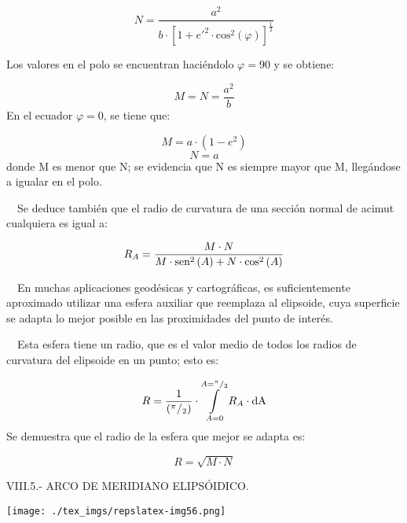 \documentclass{tufte-book}
\newcommand\wideslash[2]{{}^{#1}/_{#2}}
\newcommand\normalsubformula[1]{\text{\mathversion{normal}$#1$}}
\begin{document}
\begin{equation*}
{N=\frac{a^{{2}}}{b\cdot \left[1+e'^{{2}}\cdot \text{cos}^{{2}}\left(\varphi \right)\right]^{{\frac{1}{2}}}}}
\end{equation*}

Los valores en el polo se encuentran haciéndolo  ${\varphi =\text{90}}$ y se obtiene:

\begin{equation*}
{M=N=\frac{a^{{2}}}{b}}
\end{equation*}
En el ecuador  ${\varphi =0}$, se tiene que:

\begin{equation*}
{M=a\cdot \left(1-e^{{2}}\right)}
\end{equation*}
\begin{equation*}
{N=a}
\end{equation*}
donde M es menor que N; se evidencia que N es siempre mayor que M,
llegándose a igualar en el polo.

\ \ Se deduce también que el radio de curvatura de una sección
normal de acimut cualquiera es igual a:

\begin{equation*}
{R_{{A}}=\frac{M\cdot N}{M\cdot \normalsubformula{\text{sen}}^{{2}}\left(A\right)+N\cdot \text{cos}^{{2}}\left(A\right)}}
\end{equation*}

\ \ En muchas aplicaciones geodésicas y cartográficas, es
suficientemente aproximado utilizar una esfera auxiliar que reemplaza
al elipsoide, cuya superficie se adapta lo mejor posible en las
proximidades del punto de interés.

\ \ Esta esfera tiene un radio, que es el valor medio de todos los
radios de curvatura del elipsoide en un punto; esto es:

\begin{equation*}
{R=\frac{1}{\left(\wideslash{\pi }{2}\right)}\cdot \overset{{A=\wideslash{\pi }{2}}}{\underset{{A=0}}{\int }}{R_{{A}}\cdot \normalsubformula{\text{dA}}}}
\end{equation*}
Se demuestra que el radio de la esfera que mejor se adapta es:

\begin{equation*}
{R=\sqrt{M\cdot N}}
\end{equation*}

VIII.5.- ARCO DE MERIDIANO ELIPSÓIDICO.

\begin{marginfigure}
\texttt{[image: ./tex\_imgs/repslatex-img56.png]}
\end{marginfigure}
 
\end{document}
